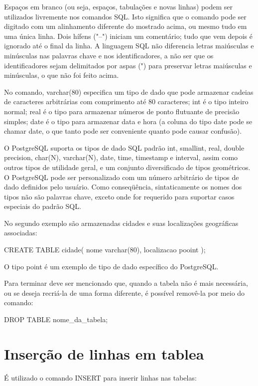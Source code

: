 Espaços em branco (ou seja, espaços, tabulações e novas linhas) podem ser utilizados livremente nos comandos SQL.
Isto significa que o comando pode ser digitado com um alinhamento diferente do mostrado acima, 
ou mesmo tudo em uma única linha. Dois hífens ("--") iniciam um comentário; tudo que vem depois 
é ignorado até o final da linha. A linguagem SQL não diferencia letras maiúsculas e minúsculas 
nas palavras chave e nos identificadores, a não ser que os identificadores sejam delimitados por
aspas (") para preservar letras maiúsculas e minúsculas, o que não foi feito acima.

No comando, varchar(80) especifica um tipo de dado que pode armazenar cadeias de caracteres arbitrárias 
com comprimento até 80 caracteres; int é o tipo inteiro normal; real é o tipo para armazenar números de ponto 
flutuante de precisão simples; date é o tipo para armazenar data e hora (a coluna do tipo date pode se chamar date, 
o que tanto pode ser conveniente quanto pode causar confusão).

O PostgreSQL suporta os tipos de dado SQL padrão int, smallint, real, double precision, char(N), varchar(N), 
date, time, timestamp e interval, assim como outros tipos de utilidade geral, e um conjunto diversificado de tipos geométricos. 
O PostgreSQL pode ser personalizado com um número arbitrário de tipos de dado definidos pelo usuário. 
Como conseqüência, sintaticamente os nomes dos tipos não são palavras chave, exceto onde for requerido para suportar casos especiais do padrão SQL.

No segundo exemplo são armazenadas cidades e suas localizações geográficas associadas:

\begin{BoxVerbatim}
CREATE TABLE cidade(
    nome              varchar(80),
    localizacao       pooint
);
\end{BoxVerbatim}

O tipo point é um exemplo de tipo de dado específico do PostgreSQL.

Para terminar deve ser mencionado que, quando a tabela não é mais necessária, ou se deseja recriá-la de uma forma diferente, é possível removê-la por meio do comando:

\begin{BoxVerbatim}
DROP TABLE nome_da_tabela;
\end{BoxVerbatim}

\section{Inserção de linhas em tablea}\setcounter{SteP}{1}
É utilizado o comando INSERT para inserir linhas nas tabelas:

